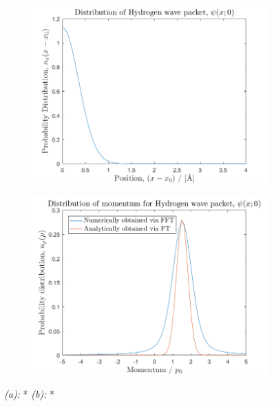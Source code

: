 \begin{figure}[H]
    \centering
    \captionsetup[subfigure]{justification=centering}
    \begin{subfigure}[b]{0.7\textwidth}
        \centering
        \includegraphics[width=\textwidth]{graphics/task1/position_prob.png}
		\caption{}
		\label{fig:*_a}
    \end{subfigure}
    \begin{subfigure}[b]{0.7\textwidth}
        \centering
        \includegraphics[width=\textwidth]{graphics/task1/momentum_prob.png}
        \caption{}
		\label{fig:*_b}
    \end{subfigure}
    \caption{\textit{(a):} * \textit{(b):} *}
    \label{fig:*}
\end{figure}

